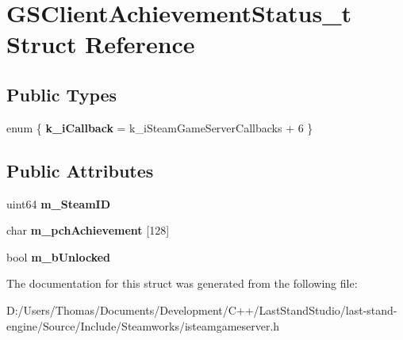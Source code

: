 \hypertarget{structGSClientAchievementStatus__t}{}\section{G\+S\+Client\+Achievement\+Status\+\_\+t Struct Reference}
\label{structGSClientAchievementStatus__t}
\subsection*{Public Types}
\begin{DoxyCompactItemize}
\item 
\hypertarget{structGSClientAchievementStatus__t_a274f388d2c4294db906a4b9216277afb}{}enum \{ {\bfseries k\+\_\+i\+Callback} = k\+\_\+i\+Steam\+Game\+Server\+Callbacks + 6
 \}\label{structGSClientAchievementStatus__t_a274f388d2c4294db906a4b9216277afb}

\end{DoxyCompactItemize}
\subsection*{Public Attributes}
\begin{DoxyCompactItemize}
\item 
\hypertarget{structGSClientAchievementStatus__t_a804f6f11137f580579e45b00515dd402}{}uint64 {\bfseries m\+\_\+\+Steam\+I\+D}\label{structGSClientAchievementStatus__t_a804f6f11137f580579e45b00515dd402}

\item 
\hypertarget{structGSClientAchievementStatus__t_ad2610d357cd03c57074fd7588ad3cdcb}{}char {\bfseries m\+\_\+pch\+Achievement} \mbox{[}128\mbox{]}\label{structGSClientAchievementStatus__t_ad2610d357cd03c57074fd7588ad3cdcb}

\item 
\hypertarget{structGSClientAchievementStatus__t_a5b4d71b206d20edc9f553750db4cb6c5}{}bool {\bfseries m\+\_\+b\+Unlocked}\label{structGSClientAchievementStatus__t_a5b4d71b206d20edc9f553750db4cb6c5}

\end{DoxyCompactItemize}


The documentation for this struct was generated from the following file\+:\begin{DoxyCompactItemize}
\item 
D\+:/\+Users/\+Thomas/\+Documents/\+Development/\+C++/\+Last\+Stand\+Studio/last-\/stand-\/engine/\+Source/\+Include/\+Steamworks/isteamgameserver.\+h\end{DoxyCompactItemize}
